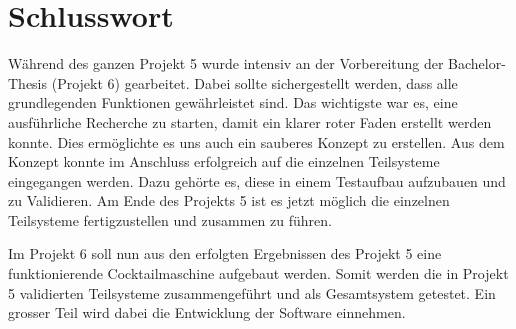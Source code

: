 \clearpage
\section{Schlusswort}\label{sec:Schlusswort}

Während des ganzen Projekt 5 wurde intensiv an der Vorbereitung der Bachelor-Thesis (Projekt 6) gearbeitet. Dabei sollte sichergestellt werden, dass alle grundlegenden Funktionen gewährleistet sind. Das wichtigste war es, eine ausführliche Recherche zu starten, damit ein klarer roter Faden erstellt werden konnte. Dies ermöglichte es uns auch ein sauberes Konzept zu erstellen. Aus dem Konzept konnte im Anschluss erfolgreich auf die einzelnen Teilsysteme eingegangen werden. Dazu gehörte es, diese in einem Testaufbau aufzubauen und zu Validieren. Am Ende des Projekts 5 ist es jetzt möglich die einzelnen Teilsysteme fertigzustellen und zusammen zu führen. 

Im Projekt 6 soll nun aus den erfolgten Ergebnissen des Projekt 5 eine funktionierende Cocktailmaschine aufgebaut werden. Somit werden die in Projekt 5 validierten Teilsysteme zusammengeführt und als Gesamtsystem getestet. Ein grosser Teil wird dabei die Entwicklung der Software einnehmen.
